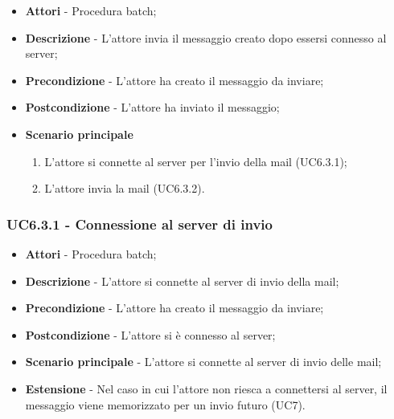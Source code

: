                     \begin{itemize}

                        \item \textbf{Attori} - Procedura batch;
                        \item \textbf{Descrizione} - L'attore invia il messaggio creato dopo essersi connesso al server;
                        \item \textbf{Precondizione} - L'attore ha creato il messaggio da inviare;
                        \item \textbf{Postcondizione} - L'attore ha inviato il messaggio;
                        \item \textbf{Scenario principale}
                            \begin{enumerate}

                                \item L'attore si connette al server per l'invio della mail (UC6.3.1);
                                \item L'attore invia la mail (UC6.3.2).

                            \end{enumerate}

                    \end{itemize}

                    \subsubsection{UC6.3.1 - Connessione al server di invio}

                        \begin{itemize}

                            \item \textbf{Attori} - Procedura batch;
                            \item \textbf{Descrizione} - L'attore si connette al server di invio della mail;
                            \item \textbf{Precondizione} - L'attore ha creato il messaggio da inviare;
                            \item \textbf{Postcondizione} - L'attore si è connesso al server;
                            \item \textbf{Scenario principale} - L'attore si connette al server di invio delle mail;
                            \item \textbf{Estensione} - Nel caso in cui l'attore non riesca a connettersi al server, il messaggio viene 									memorizzato per un invio futuro (UC7).

                        \end{itemize}

